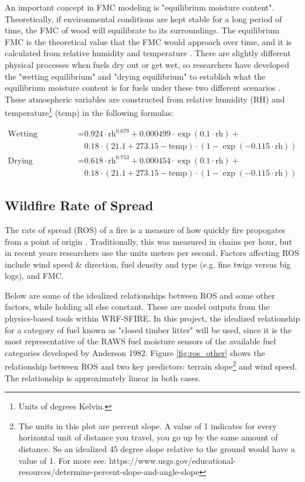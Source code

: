 \documentclass[11pt]{article}%
\begin{document}
An important concept in FMC modeling is "equilibrium moisture content". Theoretically, if environmental conditions are kept stable for a long period of time, the FMC of wood will equilibrate to its surroundings. The equilibrium FMC is the theoretical value that the FMC would approach over time, and it is calculated from relative humidity and temperature \cite{Mitchell-2018-CEM}. There are slightly different physical processes when fuels dry out or get wet, so researchers have developed the "wetting equilibrium" and "drying equilibrium" to establish what the equilibrium moisture content is for fuels under these two different scenarios \cite{Mandel-2014-RAA}. These atmospheric variables are constructed from relative humidity (RH) and temperature\footnote{Units of degrees Kelvin.} (temp) in the following formulas:



\begin{equation}
\begin{split}
\text{Wetting Equilibrium} = &0.924\cdot\text{rh}^{0.679} + 0.000499\cdot\exp(0.1\cdot\text{rh}) + \\ &0.18\cdot(21.1 + 273.15 - \text{temp})\cdot(1 - \exp(-0.115\cdot\text{rh})) \\
\text{Drying Equilibrium} = &0.618\cdot\text{rh}^{0.753} + 0.000454\cdot\exp(0.1\cdot\text{rh}) + \\ &0.18\cdot(21.1 + 273.15 - \text{temp})\cdot(1 - \exp(-0.115\cdot\text{rh}))
\end{split}
\end{equation}

\subsection{Wildfire Rate of Spread}

The rate of spread (ROS) of a fire is a measure of how quickly fire propogates from a point of origin \cite{NFSC}. Traditionally, this was measured in chains per hour, but in recent years researchers use the units meters per second. Factors affecting ROS include wind speed \& direction, fuel density and type (e.g. fine twigs versus big logs), and FMC. 

Below are some of the idealized relationships between ROS and some other factors, while holding all else constant. These are model outputs from the physics-based tools within WRF-SFIRE. In this project, the idealized relationship for a category of fuel known as "closed timber litter" will be used, since it is the most representative of the RAWS fuel moisture sensors of the available fuel categories developed by Anderson 1982. \cite{NIFC-Fuels} Figure \ref{fig:ros_other} shows the relationship between ROS and two key predictors: terrain slope\footnote{The units in this plot are percent slope. A value of 1 indicates for every horizontal unit of distance you travel, you go up by the same amount of distance. So an idealized 45 degree slope relative to the ground would have a value of 1. For more see: https://www.usgs.gov/educational-resources/determine-percent-slope-and-angle-slope} and wind speed. \cite{openwfm_fuels} The relationship is approximately linear in both cases.
\end{document}
